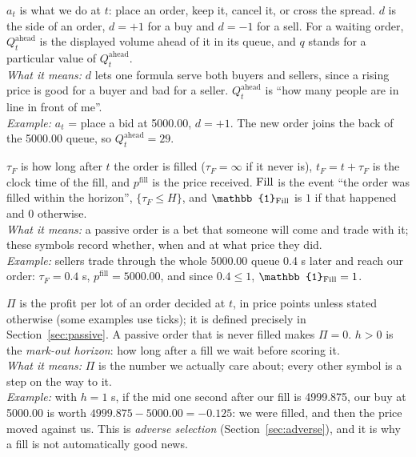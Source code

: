 \begin{description}[leftmargin=1.5em,style=nextline,itemsep=4pt]
\item[Actions and orders]
  $a_t$ is what we do at $t$: place an order, keep it, cancel it, or cross the spread. $d$ is the
  side of an order, $d = +1$ for a buy and $d = -1$ for a sell. For a waiting order,
  $Q^{\text{ahead}}_t$ is the displayed volume ahead of it in its queue, and $q$ stands for a
  particular value of $Q^{\text{ahead}}_t$.\\
  \emph{What it means:} $d$ lets one formula serve both buyers and sellers, since a rising price is
  good for a buyer and bad for a seller. $Q^{\text{ahead}}_t$ is ``how many people are in line in
  front of me''.\\
  \emph{Example:} $a_t$ = place a bid at 5000.00, $d = +1$. The new order joins the back of the
  5000.00 queue, so $Q^{\text{ahead}}_t = 29$.

\item[Fills]
  $\tau_F$ is how long after $t$ the order is filled ($\tau_F = \infty$ if it never is),
  $t_F = t + \tau_F$ is the clock time of the fill, and $p^{\text{fill}}$ is the price received.
  $\mathrm{Fill}$ is the event ``the order was filled within the horizon'', $\{\tau_F \le H\}$, and
  $\mathbb{1}_{\Fill}$ is $1$ if that happened and $0$ otherwise.\\
  \emph{What it means:} a passive order is a bet that someone will come and trade with it; these
  symbols record whether, when and at what price they did.\\
  \emph{Example:} sellers trade through the whole 5000.00 queue 0.4 s later and reach our order:
  $\tau_F = 0.4$ s, $p^{\text{fill}} = 5000.00$, and since $0.4 \le 1$, $\mathbb{1}_{\Fill} = 1$.

\item[Profit]
  $\Pi$ is the profit per lot of an order decided at $t$, in price points unless stated otherwise
  (some examples use ticks); it is defined precisely in Section~\ref{sec:passive}. A passive order
  that is never filled makes $\Pi = 0$. $h > 0$ is the \emph{mark-out horizon}: how long after a
  fill we wait before scoring it.\\
  \emph{What it means:} $\Pi$ is the number we actually care about; every other symbol is a step
  on the way to it.\\
  \emph{Example:} with $h = 1$ s, if the mid one second after our fill is 4999.875, our buy at
  5000.00 is worth $4999.875 - 5000.00 = -0.125$: we were filled, and then the price moved against
  us. This is \emph{adverse selection} (Section~\ref{sec:adverse}), and it is why a fill is not
  automatically good news.


\end{description}

